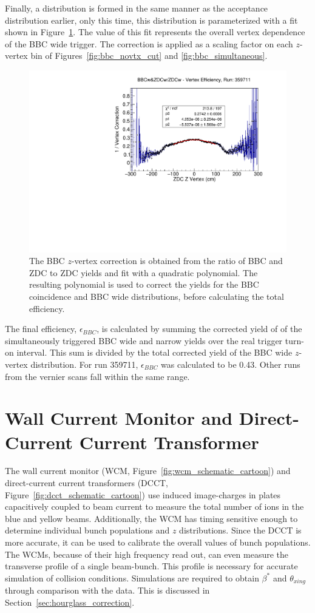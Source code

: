 Finally, a distribution is formed in the same manner as the acceptance
distribution earlier, only this time, this distribution is parameterized with a
fit shown in Figure~\ref{fig:vertex_correction}. The value of this fit
represents the overall vertex dependence of the BBC wide trigger. The
correction is applied as a scaling factor on each $z$-vertex bin of
Figures~\ref{fig:bbc_novtx_cut} and \ref{fig:bbc_simultaneous}.

\begin{figure}[ht]
  \centering
  \includegraphics[width=0.8\linewidth]{./figures/vertex_correction.pdf}
  \caption{
    The BBC $z$-vertex correction is obtained from the ratio of BBC and ZDC to
    ZDC yields and fit with a quadratic polynomial. The resulting polynomial is
    used to correct the yields for the BBC coincidence and BBC wide
    distributions, before calculating the total efficiency.
  }
  \label{fig:vertex_correction}
\end{figure}

The final efficiency, $\epsilon_{BBC}$, is calculated by summing the corrected
yield of of the simultaneously triggered BBC wide and narrow yields over the
real trigger turn-on interval. This sum is divided by the total corrected yield
of the BBC wide $z$-vertex distribution.  For run 359711, $\epsilon_{BBC}$ was
calculated to be 0.43. Other runs from the vernier scans fall within the same
range.

\clearpage
\section{Wall Current Monitor and Direct-Current Current Transformer}

The wall current monitor (WCM, Figure~\ref{fig:wcm_schematic_cartoon}) and
direct-current current transformers (DCCT,
Figure~\ref{fig:dcct_schematic_cartoon}) use induced image-charges in plates
capacitively coupled to beam current to measure the total number of ions in the
blue and yellow beams. Additionally, the WCM has timing sensitive enough to
determine individual bunch populations and $z$ distributions. Since the DCCT is
more accurate, it can be used to calibrate the overall values of bunch
populations. The WCMs, because of their high frequency read out, can even
measure the transverse profile of a single beam-bunch. This profile is necessary
for accurate simulation of collision conditions. Simulations are required to
obtain $\beta^*$ and $\theta_{xing}$ through comparison with the data. This is
discussed in Section~\ref{sec:hourglass_correction}.

